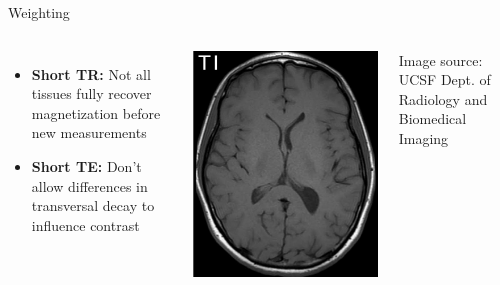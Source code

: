 \begin{frame}{\longtime{} Weighting}

    \begin{columns}[t,onlytextwidth]
        

        \begin{itemize}
            \item \textbf{Short TR:} Not all tissues fully recover magnetization before new measurements
            \item \textbf{Short TE:} Don't allow differences in transversal decay to influence contrast
        \end{itemize}

        \includegraphics[height=0.6\textheight]{images/t1}

        {\scriptsize Image source: UCSF Dept. of Radiology and Biomedical Imaging}
    \end{columns}
\end{frame}

